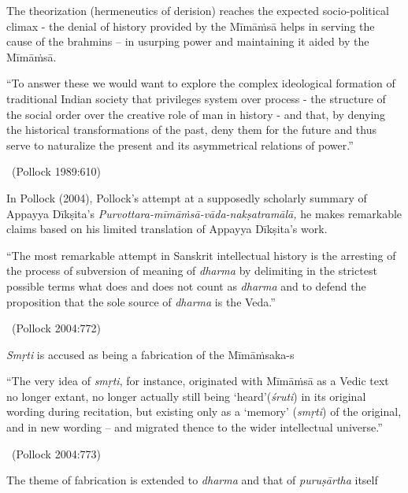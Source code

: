 The theorization (hermeneutics of derision) reaches the expected socio-political climax - the denial of history provided by the Mīmāṁsā helps in serving the cause of the brahmins – in usurping power and maintaining it aided by the Mīmāṁsā.
\begin{myquote}
“To answer these we would want to explore the complex ideological formation of traditional Indian society that privileges system over process - the structure of the social order over the creative role of man in history - and that, by denying the historical transformations of the past, deny them for the future and thus serve to naturalize the present and its asymmetrical relations of power.”

~\hfill (Pollock 1989:610)
\end{myquote}

In Pollock (2004), Pollock’s attempt at a supposedly scholarly summary of Appayya Dīkṣita’s \textit{Purvottara-mīmāṁsā-vāda-nakṣatramālā,} he makes remarkable claims based on his limited translation of Appayya Dīkṣita’s work.
\begin{myquote}
“The most remarkable attempt in Sanskrit intellectual history is the arresting of the process of subversion of meaning of \textit{dharma} by delimiting in the strictest possible terms what does and does not count as \textit{dharma} and to defend the proposition that the sole source of \textit{dharma} is the Veda.”

~\hfill (Pollock 2004:772)
\end{myquote}

\textit{Smṛti} is accused as being a fabrication of the Mīmāṁsaka-s
\begin{myquote}
“The very idea of \textit{smṛti}, for instance, originated with Mīmāṁsā as a Vedic text no longer extant, no longer actually still being ‘heard’(\textit{śruti}) in its original wording during recitation, but existing only as a ‘memory’ (\textit{smṛti}) of the original, and in new wording – and migrated thence to the wider intellectual universe.”

\vskip -5pt

~\hfill (Pollock 2004:773)
\end{myquote}

The theme of fabrication is extended to \textit{dharma} and that of \textit{puruṣārtha} itself

